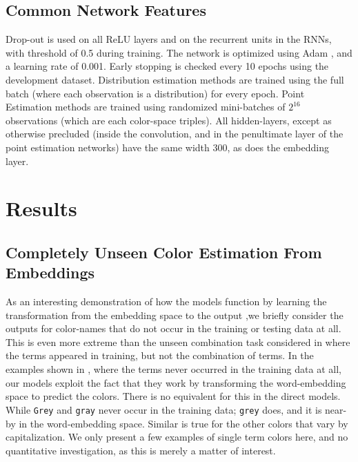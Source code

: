 \documentclass[]{clv3}
\newcommand{\parencite}{\citep}
\newcommand{\natlang}[1]{\texttt{#1}}
\begin{document}
\subsection{Common Network Features}
Drop-out \parencite{srivastava2014dropout}  is used on all ReLU layers and on the recurrent units in the RNNs, with threshold of 0.5 during training.
The network is optimized using Adam \parencite{kingma2014adam}, and a learning rate of 0.001.
Early stopping is checked every 10 epochs using the development dataset.
Distribution estimation methods are trained using the full batch (where each observation is a distribution) for every epoch.
Point Estimation methods are trained using randomized mini-batches of $2^{16}$ observations (which are each color-space triples).
All hidden-layers, except as otherwise precluded (inside the convolution, and in the penultimate layer of the point estimation networks) have the same width 300, as does the embedding layer.



\section{Results}\label{sec:results}






\subsection{Completely Unseen Color Estimation From Embeddings}\label{sec:embeddingonly}
As an interesting demonstration of how the models function by learning the transformation from the embedding space to the output ,we briefly consider the outputs for color-names that do not occur in the training or testing data at all.
This is even more extreme than the unseen combination task considered in  where the terms appeared in training, but not the combination of terms.
In the examples shown in , where the terms never occurred in the training data at all, our models exploit the fact that they work by transforming the word-embedding space to predict the colors.
There is no equivalent for this in the direct models.
While \natlang{Grey} and \natlang{gray} never occur in the training data; \natlang{grey} does, and it is near-by in the word-embedding space.
Similar is true for the other colors that vary by capitalization.
We only present a few examples of single term colors here, and no quantitative investigation, as this is merely a matter of interest.
\end{document}
